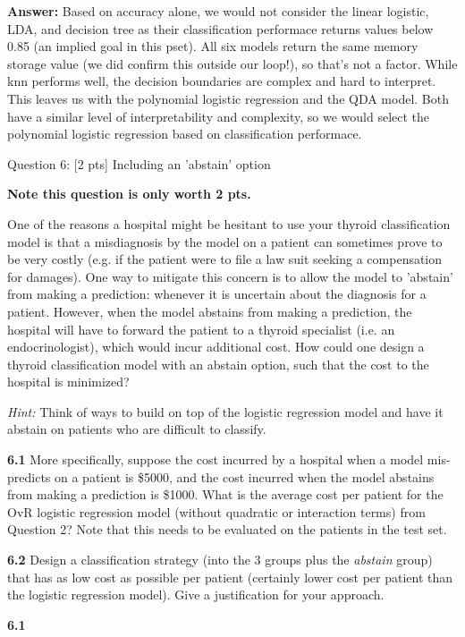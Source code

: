 \documentclass[11pt]{article}
\begin{document}
    \textbf{Answer:} Based on accuracy alone, we would not consider the
linear logistic, LDA, and decision tree as their classification
performace returns values below 0.85 (an implied goal in this pset). All
six models return the same memory storage value (we did confirm this
outside our loop!), so that's not a factor. While knn performs well, the
decision boundaries are complex and hard to interpret. This leaves us
with the polynomial logistic regression and the QDA model. Both have a
similar level of interpretability and complexity, so we would select the
polynomial logistic regression based on classification performace.

     Question 6: {[}2 pts{]} Including an 'abstain' option

\textbf{Note this question is only worth 2 pts. }

One of the reasons a hospital might be hesitant to use your thyroid
classification model is that a misdiagnosis by the model on a patient
can sometimes prove to be very costly (e.g. if the patient were to file
a law suit seeking a compensation for damages). One way to mitigate this
concern is to allow the model to 'abstain' from making a prediction:
whenever it is uncertain about the diagnosis for a patient. However,
when the model abstains from making a prediction, the hospital will have
to forward the patient to a thyroid specialist (i.e. an
endocrinologist), which would incur additional cost. How could one
design a thyroid classification model with an abstain option, such that
the cost to the hospital is minimized?

\emph{Hint:} Think of ways to build on top of the logistic regression
model and have it abstain on patients who are difficult to classify.

    \textbf{6.1} More specifically, suppose the cost incurred by a hospital
when a model mis-predicts on a patient is \$5000, and the cost incurred
when the model abstains from making a prediction is \$1000. What is the
average cost per patient for the OvR logistic regression model (without
quadratic or interaction terms) from Question 2? Note that this needs to
be evaluated on the patients in the test set.

\textbf{6.2} Design a classification strategy (into the 3 groups plus
the \emph{abstain} group) that has as low cost as possible per patient
(certainly lower cost per patient than the logistic regression model).
Give a justification for your approach.

    \textbf{6.1}
\end{document}
